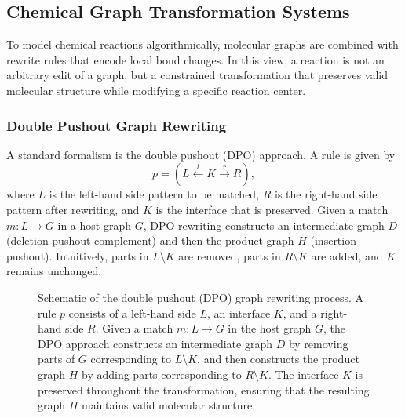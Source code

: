 \subsection{Chemical Graph Transformation Systems}
To model chemical reactions algorithmically, molecular graphs are combined with rewrite rules that encode local bond changes. \cite[p.~76]{Echahed2016}
In this view, a reaction is not an arbitrary edit of a graph, but a constrained transformation that preserves valid molecular structure while modifying a specific reaction center. \cite[p.~2]{Andersen2013} \cite[p.~6]{Abel2026}

\subsubsection{Double Pushout Graph Rewriting}
A standard formalism is the double pushout (DPO) approach. \cite[p.~3]{Andersen2013} A rule is given by
\[
p = (L \xleftarrow{l} K \xrightarrow{r} R),
\]
where \(L\) is the left-hand side pattern to be matched, \(R\) is the right-hand side pattern after rewriting, and \(K\) is the interface that is preserved. \cite[p.~75]{Echahed2016}
Given a match \(m:L\to G\) in a host graph \(G\), DPO rewriting constructs an intermediate graph \(D\) (deletion pushout complement) \cite[p.~680]{HABEL2001}and then the product graph \(H\) (insertion pushout).
Intuitively, parts in \(L\setminus K\) are removed, parts in \(R\setminus K\) are added, and \(K\) remains unchanged. \cite[p.~3]{Andersen2013} \cite[p.~4]{Flamm2025}

\begin{figure}[H]
    \centering
    \caption[Double pushout graph rewriting]{
        Schematic of the double pushout (DPO) graph rewriting process.
        A rule \(p\) consists of a left-hand side \(L\), an interface \(K\), and a right-hand side \(R\).
        Given a match \(m: L \to G\) in the host graph \(G\), the DPO approach constructs an intermediate graph \(D\) by removing parts of \(G\) corresponding to \(L \setminus K\), and then constructs the product graph \(H\) by adding parts corresponding to \(R \setminus K\).
        The interface \(K\) is preserved throughout the transformation, ensuring that the resulting graph \(H\) maintains valid molecular structure.
    }
    \label{fig:dpo-rewriting}
\end{figure}



